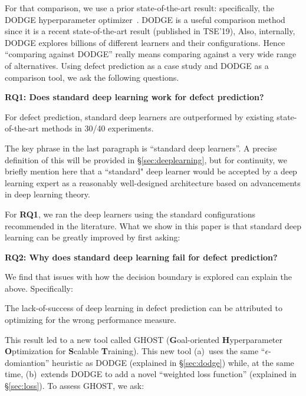 \documentclass[10pt,compsoc,twocolumn]{IEEEtran}
\newcommand{\ei}{\end{itemize}}
\newcommand{\respto}[1]{
\fcolorbox{black}{black!15}{%
\label{resp:#1}%
\bf\scriptsize R{#1}}}
\newcommand{\BLUE}{\color{blue}}
\newcommand{\BLACK}{\color{black}}
\begin{document}
For that comparison, we use  a prior state-of-the-art result: specifically, the
DODGE hyperparameter optimizer~\cite{agrawal2019dodge}.
DODGE is a useful comparison method since it is a recent state-of-the-art result (published in TSE'19), Also, internally,
DODGE explores billions of  different learners and their configurations. Hence ``comparing against DODGE'' really means comparing against a very wide range of alternatives. 
Using defect prediction as a case study and DODGE as a comparison tool, we ask the following questions.

\textbf{RQ1: Does standard deep learning work for defect prediction?}


\begin{blockquote}
    \noindent
    \BLUE
    For defect prediction,
    standard deep learners are outperformed by existing state-of-the-art methods in 30/40 experiments. \BLACK
    \respto{2a1.1}
\end{blockquote}


The key phrase in the last paragraph is ``standard deep learners''. \BLUE A precise definition of this will be provided in \S \ref{sec:deeplearning}, but for continuity, we briefly mention here that a ``standard" deep learner would be accepted by a deep learning expert as a reasonably well-designed architecture based on advancements in deep learning theory. \BLACK

For {\bf RQ1}, we ran the deep learners using the  standard configurations recommended in the literature. What we show in this paper is that standard deep learning can be greatly improved by first asking:

\textbf{RQ2: Why does standard deep learning fail for defect prediction?}

We find that issues with
how the decision boundary
is explored can explain the above.
Specifically: 

\begin{blockquote}
    \noindent
   The lack-of-success of deep learning in defect prediction can be attributed to optimizing for the wrong performance measure.
\end{blockquote}
This result led to a new tool called GHOST (\textbf{G}oal-oriented \textbf{H}yperparameter \textbf{O}ptimization for \textbf{S}calable \textbf{T}raining). 
This new tool  (a)~uses the same \mbox{``$\epsilon$-domiantion''} heuristic as DODGE (explained in \S\ref{sec:dodge}) while, at the same time, (b)~extends DODGE to add a novel ``weighted loss function'' (explained in \S\ref{sec:loss}).
To assess GHOST, we ask:
\end{document}
